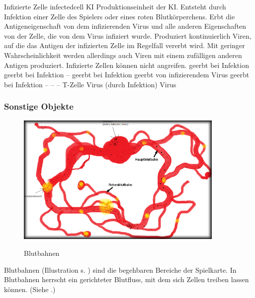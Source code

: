 \cellentry
  {Infizierte Zelle}
  {infectedcell}
  {KI}
  {Produktionseinheit der KI. Entsteht durch Infektion einer Zelle des
   Spielers oder eines roten Blutkörperchens. Erbt die Antigeneigenschaft
   von dem infizierenden Virus und alle anderen Eigenschaften von der
   Zelle, die von dem Virus infiziert wurde. Produziert kontinuierlich Viren,
   auf die das Antigen der infizierten Zelle im Regelfall vererbt wird. Mit
   geringer Wahrscheinlichkeit werden allerdings auch Viren mit einem
   zufälligen anderen Antigen produziert. Infizierte Zellen können nicht
   angreifen.
  }
  {geerbt bei Infektion} %
  {geerbt bei Infektion} %
  {--} %
  {geerbt bei Infektion} %
  {geerbt von infizierendem Virus} %
\cellentryctd
  {geerbt bei Infektion}
  {--} %
  {--} %
  {--} %
  {T-Zelle} %
  {Virus (durch Infektion)} %
  {Virus} %

\subsubsection{Sonstige Objekte}


\begin{figure}
  \begin{center}
  \includegraphics[width=10cm]{./img_objekte/blutbahn.png}\\
  \end{center}

  \caption{Blutbahnen}
  \label{fig:blutbahnen}
\end{figure}

Blutbahnen (Illustration s. ) sind die begehbaren
Bereiche der Spielkarte. In Blutbahnen herrscht ein gerichteter Blutfluss, mit
dem sich Zellen treiben lassen können. (Siehe .)

